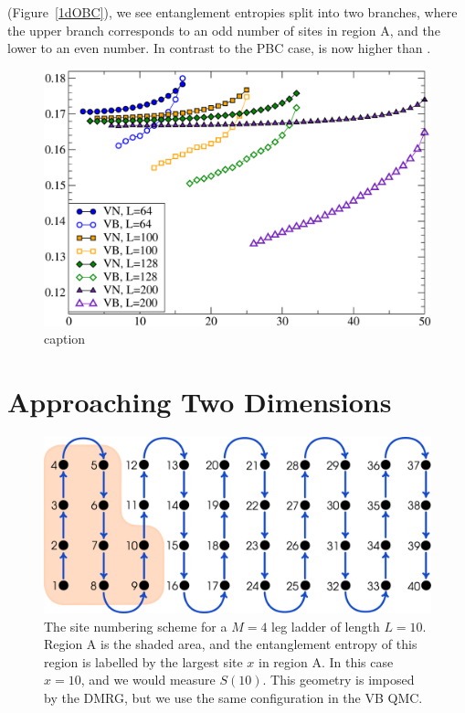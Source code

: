  (Figure~\ref{1dOBC}), we see entanglement entropies split into two branches, where the upper branch corresponds to an odd number of sites in region A, and the lower to an even number.
In contrast to the PBC case, \vb is now higher than \vn.

\begin{figure} {
\includegraphics[width=6in]{./figures/paper1/figure1/fig2_NEW.pdf} 
\centering
\caption[caption]{ 
	caption
}}
\end{figure}


\section{Approaching Two Dimensions}

\begin{figure} { \includegraphics[width=6in]{./figures/made/stuff_covering.pdf}
\centering
\caption[Geometry of a four-leg ladder]{
The site numbering scheme for a $M=4$ leg ladder of length $L=10$.  Region A is the shaded area, and the entanglement entropy of this region is labelled by the largest site $x$ in region A.
In this case $x=10$, and we would measure $S(10)$.  
This geometry is imposed by the DMRG, but we use the same configuration in the VB QMC.
 \label{laddersnake} }} 
 \end{figure}


